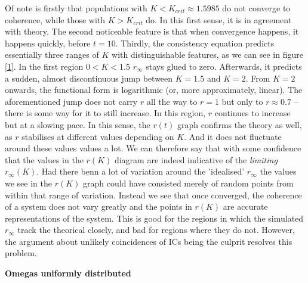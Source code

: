 \documentclass[11pt,a4paper]{article}
\begin{document}
Of note is firstly that populations with $K<K_{crit} \approx 1.5985$ do not converge to coherence, while those with $K>K_{crit}$ do. 
In this first sense, it is in agreement with theory. 
%
The second noticeable feature is that when convergence happens, it happens quickly, before $t = 10$.
% 
Thirdly, the consistency equation predicts essentially three ranges of $K$ with distinguishable features, as we can see in figure \ref{1}.
In the first region $0<K<1.5$ $r_\infty$ stays glued to zero. 
Afterwards, it predicts a sudden, almost discontinuous jump between $K=1.5$ and $K=2$. 
From $K=2$ onwards, the functional form is logarithmic (or, more approximately, linear).
The aforementioned jump does not carry $r$ all the way to $r=1$ but only to $r\approx 0.7$ -- there is some way for it to still increase. 
In this region, $r$ continues to increase but at a slowing pace. 
In this sense, the $r(t)$ graph confirms the theory as well, as $r$ stabilises at different values depending on $K$. 
And it does not fluctuate around these values values a lot. 
We can therefore say that with some confidence that the values in the $r(K)$ diagram are indeed indicative of the \textit{limiting} $r_\infty(K)$. 
Had there benn a lot of variation around the 'idealised' $r_\infty$ the values we see in the $r(K)$ graph could have consisted merely of random points from within that range of variation. 
Instead we see that once converged, the coherence of a system does not vary greatly and the points in $r(K)$ are accurate representations of the system. 
This is good for the regions in which the simulated $r_\infty$ track the theorical closely, and bad for regions where they do not. 
However, the argument about unlikely coincidences of ICs being the culprit resolves this problem. 
















\clearpage
\FloatBarrier
\bigskip\noindent
{\Large\textbf{Omegas uniformly distributed}}
\end{document}
